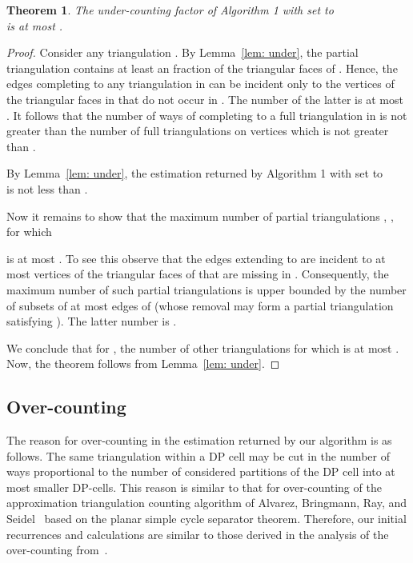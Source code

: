 \documentclass[a4paper]{article}
\newtheorem{theorem}{Theorem}
\begin{document}
\begin{theorem} \label{theo: under}
The under-counting factor of
Algorithm 1 with
 set to\\
 is
at most .
\end{theorem}
\begin{proof}
Consider any triangulation .
By Lemma~\ref{lem: under}, the partial triangulation 
contains at least an  fraction
of the triangular faces of . Hence, the edges
completing  to any triangulation in 
can be incident only to the vertices of the
triangular faces in  that do not occur
in . The number of the latter is at most
. It follows that
the number of ways of completing  to a
full triangulation in  is not greater
than the number of full triangulations
on  vertices which is
not greater than .

By Lemma~\ref{lem: under}, 
the estimation returned by
Algorithm 1 with  set to\\
 is not less
than  .

Now it remains to show that the maximum number of
partial triangulations , , for which

is at most . To see this
observe that the edges extending 
to  are incident to at most 
vertices of the  triangular faces of 
that are missing in . Consequently,
the maximum number of such partial triangulations 
is upper bounded by the number of subsets
of at most  edges of 
(whose removal may form a partial triangulation
 satisfying  ).
The latter number is .


We conclude that for , 
the number of other triangulations
 for which 
is at most . Now, the theorem follows
from Lemma~\ref{lem: under}.
\end{proof}

\subsection{Over-counting}

The reason for over-counting in the estimation
returned by our algorithm is as follows.
The same
triangulation within a DP cell
may be cut in the number of
ways proportional to the number 
of considered partitions of the DP cell into at most 
smaller DP-cells. This reason is similar to
that for over-counting of the approximation
triangulation counting algorithm of  Alvarez, Bringmann, Ray, 
and Seidel~\cite{ABRS13}
based on the planar simple cycle separator theorem.
Therefore, 
our initial recurrences and calculations 
are similar to those derived
in the analysis of the over-counting from~\cite{ABRS13}.
\end{document}
